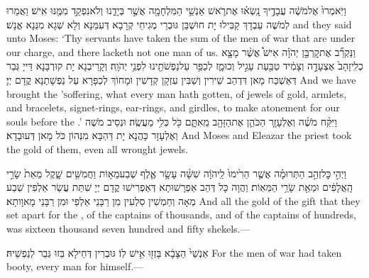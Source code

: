 {וַיֹּֽאמְרוּ֙ אֶל\maqqaf מֹשֶׁ֔ה עֲבָדֶ֣יךָ נָֽשְׂא֗וּ אֶת\maqqaf רֹ֛אשׁ אַנְשֵׁ֥י הַמִּלְחָמָ֖ה אֲשֶׁ֣ר בְּיָדֵ֑נוּ וְלֹא\maqqaf נִפְקַ֥ד מִמֶּ֖נּוּ אִֽישׁ׃}
{וַאֲמַרוּ לְמֹשֶׁה עַבְדָךְ קַבִּילוּ יָת חוּשְׁבַּן גּוּבְרֵי מְגִיחֵי קְרָבָא דְּעִמַּנָא וְלָא שְׁגָא מִנַּנָא אֱנָשׁ׃}
{and they said unto Moses: ‘Thy servants have taken the sum of the men of war that are under our charge, and there lacketh not one man of us.}{}
{וַנַּקְרֵ֞ב אֶת\maqqaf קׇרְבַּ֣ן יְהֹוָ֗ה אִישׁ֩ אֲשֶׁ֨ר מָצָ֤א כְלִֽי\maqqaf זָהָב֙ אֶצְעָדָ֣ה וְצָמִ֔יד טַבַּ֖עַת עָגִ֣יל וְכוּמָ֑ז לְכַפֵּ֥ר עַל\maqqaf נַפְשֹׁתֵ֖ינוּ לִפְנֵ֥י יְהֹוָֽה׃}
{וְקָרֵיבְנָא יָת קוּרְבָּנָא דַּייָ גְּבַר דְּאַשְׁכַּח מָאן דִּדְהַב שֵׁירִין וְשַׁבִּין עִזְקָן קְדָשִׁין וּמָחוֹךְ לְכַפָּרָא עַל נַפְשָׁתַנָא קֳדָם יְיָ׃}
{And we have brought the \lord\textsc{’s}\space offering, what every man hath gotten, of jewels of gold, armlets, and bracelets, signet-rings, ear-rings, and girdles, to make atonement for our souls before the \lord.’}{}
{וַיִּקַּ֨ח מֹשֶׁ֜ה וְאֶלְעָזָ֧ר הַכֹּהֵ֛ן אֶת\maqqaf הַזָּהָ֖ב מֵֽאִתָּ֑ם כֹּ֖ל כְּלִ֥י מַעֲשֶֽׂה׃}
{וּנְסֵיב מֹשֶׁה וְאֶלְעָזָר כָּהֲנָא יָת דַּהְבָּא מִנְּהוֹן כֹּל מָאן דְּעוּבָדָא׃}
{And Moses and Eleazar the priest took the gold of them, even all wrought jewels.}{}

{וַיְהִ֣י \legarmeh  כׇּל\maqqaf זְהַ֣ב הַתְּרוּמָ֗ה אֲשֶׁ֤ר הֵרִ֙ימוּ֙ לַֽיהֹוָ֔ה שִׁשָּׁ֨ה עָשָׂ֥ר אֶ֛לֶף שְׁבַע\maqqaf מֵא֥וֹת וַחֲמִשִּׁ֖ים שָׁ֑קֶל מֵאֵת֙ שָׂרֵ֣י הָֽאֲלָפִ֔ים וּמֵאֵ֖ת שָׂרֵ֥י הַמֵּאֽוֹת׃}
{וַהֲוָה כָּל דְּהַב אַפְרָשׁוּתָא דְּאַפְרִישׁוּ קֳדָם יְיָ שִׁתַּת עֲשַׂר אַלְפִין שְׁבַע מְאָה וְחַמְשִׁין סִלְעִין מִן רַבָּנֵי אַלְפֵי וּמִן רַבָּנֵי מָאוָותָא׃}
{And all the gold of the gift that they set apart for the \lord, of the captains of thousands, and of the captains of hundreds, was sixteen thousand seven hundred and fifty shekels.—}{}

{אַנְשֵׁי֙ הַצָּבָ֔א בָּזְז֖וּ אִ֥ישׁ לֽוֹ׃}
{גּוּבְרִין דְּחֵילָא בַּזוּ גְּבַר לְנַפְשֵׁיהּ׃}
{For the men of war had taken booty, every man for himself.—}{}

